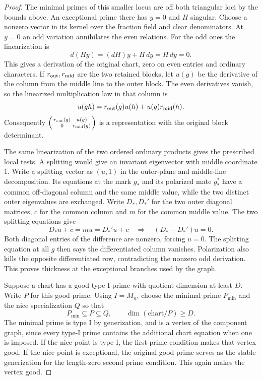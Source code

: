 \begin{proof}
The minimal primes of this smaller locus are off both triangular
loci by the bounds above. An exceptional prime there has \(y=0\)
and \(H\) singular. Choose a nonzero vector in its kernel
over the fraction field and clear denominators. At \(y=0\) an odd variation annihilates the even relations. For the odd ones the linearization is
\[
 d(Hy)=(dH)y+H\,dy=H\,dy=0 .
\] This gives a derivation
of the original chart, zero on even entries and ordinary characters.
If \(r_{\rm out},r_{\rm mid}\) are the two retained blocks,
let \(u(g)\) be the derivative of the column from the middle
line to the outer block. The even derivatives vanish, so the
linearized multiplication law in that column is
\[
   u(gh)=r_{\rm out}(g)u(h)+u(g)r_{\rm mid}(h).
\]
Consequently \(\left(\begin{smallmatrix}r_{\rm out}(g)&u(g)\\
0&r_{\rm mid}(g)\end{smallmatrix}\right)\) is a representation with
the original block determinant.

The same linearization of the
two ordered ordinary products gives the prescribed local tests. A splitting would give an
invariant eigenvector with middle coordinate 1. Write a splitting vector as \((u,1)\) in the outer-plane
and middle-line decomposition. Its equations at the mark
\(g_*\) and its polarized mate \(g_*^*\) have a common
off-diagonal column and the same middle value, while the
two distinct outer eigenvalues are exchanged. Write \(D_*,D_*'\) for the two outer diagonal matrices, \(c\) for
the common column and \(m\) for the common middle value. The two splitting
equations give
\[
 D_*u+c=mu=D_*'u+c
 \quad\Longrightarrow\quad (D_*-D_*')u=0 .
\]
Both diagonal entries of the difference are nonzero, forcing \(u=0\). The splitting equation at all
\(g\) then says the differentiated column vanishes. Polarization also kills the opposite differentiated
row, contradicting the nonzero odd derivation. This proves
thickness at the exceptional branches used by the graph.

Suppose a chart has a good type-I prime with quotient dimension
at least \(D\). Write \(P\) for this good prime. Using \(I=M_n\), choose the minimal prime \(P_{\min}\) and the nice specialization \(Q\) so that
\[
 P_{\min}\subseteq P\subseteq Q,\qquad \dim(\text{chart}/P)\ge D .
\] The minimal prime is
type I by generization, and is a vertex of the component graph,
since every type-I prime contains the additional chart equation
when one is imposed. If the nice point is type I, the first
prime condition makes that vertex good. If the nice point is
exceptional, the original good prime serves as the stable
generization for the length-zero second prime condition. This
again makes the vertex good.


\end{proof}
